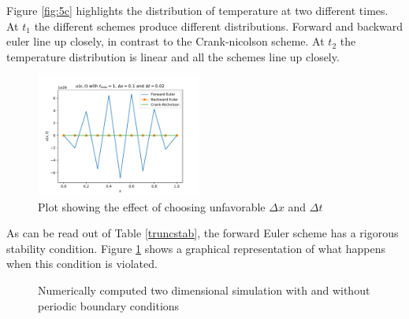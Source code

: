 \documentclass[10pt,a4paper]{article}
\begin{document}
\noindent Figure \ref{fig:5c} highlights the distribution of temperature at two different times. At $t_1$ the different schemes produce different distributions. Forward and backward euler line up closely, in contrast to the Crank-nicolson scheme. At $t_2$ the temperature distribution is linear and all the schemes line up closely. 

\begin{figure} [H]
	\centering
	\includegraphics[width=0.48\textwidth]{../plots/unstable.pdf}
	\caption{\label{fig:unstable} Plot showing the effect of choosing unfavorable $\Delta x$ and $\Delta t$}
\end{figure}

\noindent As can be read out of Table \ref{truncstab}, the forward Euler scheme has a rigorous stability condition. Figure \ref{fig:unstable} shows a graphical representation of what happens when this condition is violated. 

\begin{figure} [H]
	\centering
	\caption{\label{fig:5d} Numerically computed two dimensional simulation with and without periodic boundary conditions}
\end{figure}
\end{document}
